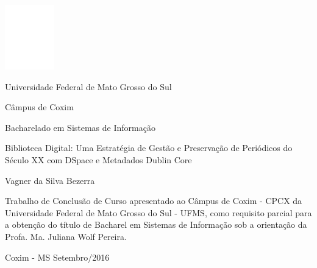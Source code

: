 \begin{center}
	\centerline{\includegraphics[scale=1]{figuras/logo-ufms-cabecalho-em-branco.png}}
	
	\vskip 0.5cm
	
	{\fontsize{14pt}{14pt}\selectfont Universidade Federal de Mato Grosso do Sul}
	
	{\fontsize{12pt}{12pt}\selectfont Câmpus de Coxim}
	
	{\fontsize{12pt}{12pt}\selectfont Bacharelado em Sistemas de Informação}
	
	\vskip 2.5cm
	
	{\fontsize{16pt}{16pt}\selectfont Biblioteca Digital: Uma Estratégia de Gestão e Preservação de Periódicos do Século XX com DSpace e Metadados Dublin Core}
	
	\vskip 2.5cm
	
	{\fontsize{12pt}{12pt}\selectfont Vagner da Silva Bezerra}
	
	\vskip 2.3cm

	\hspace{8.2cm}
	\begin{minipage}{7.8cm}
		Trabalho de Conclusão de Curso apresentado ao Câmpus de Coxim - CPCX da Universidade Federal de Mato Grosso do Sul - UFMS, como requisito parcial para a obtenção do título de Bacharel em Sistemas de Informação sob a orientação da Profa. Ma. Juliana Wolf Pereira.
	\end{minipage}%
	\vspace*{\fill}
	
	\vskip 4cm
	
	{\fontsize{12pt}{12pt}\selectfont Coxim - MS}
	\break
	{\fontsize{12pt}{12pt}\selectfont Setembro/2016}
	
\end{center}
\clearpage
\thispagestyle{empty}
\newpage

